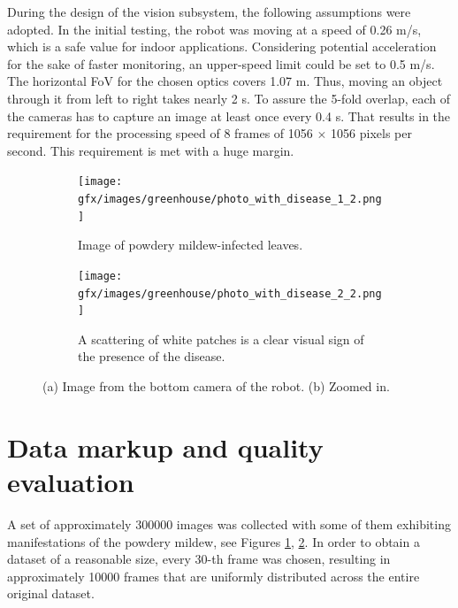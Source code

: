 \begin{description}
During the design of the vision subsystem, the following assumptions were adopted.
In the initial testing, the robot was moving at a speed of 0.26 \si{m/s}, which is a safe value for indoor applications.
Considering potential acceleration for the sake of faster monitoring, an upper-speed limit could be set to 0.5 \si{m/s}.
The horizontal FoV for the chosen optics covers 1.07 \si{m}.
Thus, moving an object through it from left to right takes nearly 2 \si{s}.
To assure the 5-fold overlap, each of the cameras has to capture an image at least once every 0.4 \si{s}.
That results in the requirement for the processing speed of 8 frames of 1056 $\times$ 1056 pixels per second.
This requirement is met with a huge margin.

\begin{figure}
    \centering

    \begin{subfigure}[b]{0.42\textwidth}
        \centering
        \texttt{[image: gfx/images/greenhouse/photo\_with\_disease\_1\_2.png]}
        \caption{Image of powdery mildew-infected leaves.}
        \label{fig_photo_with_powdery_mildew}
    \end{subfigure}
    \hfill
    \begin{subfigure}[b]{0.42\textwidth}
        \centering
        \texttt{[image: gfx/images/greenhouse/photo\_with\_disease\_2\_2.png]}
        \caption{A scattering of white patches is a clear visual sign of the presence of the disease.}
        \label{fig_photo_with_powdery_mildew_zoomed}
    \end{subfigure}
    \caption{(a) Image from the bottom camera of the robot. (b) Zoomed in.}
    \label{fig_leaves}
\end{figure}

\section{Data markup and quality evaluation}
\label{Markup}
A set of approximately 300000 images was collected with some of them exhibiting manifestations of the powdery mildew, see Figures \ref{fig_photo_with_powdery_mildew}, \ref{fig_photo_with_powdery_mildew_zoomed}.
In order to obtain a dataset of a reasonable size, every 30-th frame was chosen, resulting in approximately 10000 frames that are uniformly distributed across the entire original dataset.


\end{description}
